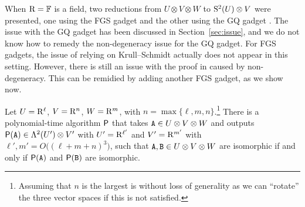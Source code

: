 When $\rng=\F$ is a field, two reductions from $U\otimes V\otimes W$ to $\S^2(U)\otimes V$ were presented, one using the FGS gadget \cite{TI1} and the other using the GQ gadget \cite{TI4}. The issue with the GQ gadget has been discussed in Section~\ref{sec:issue}, and we do not know how to remedy the non-degeneracy issue for the GQ gadget. For FGS gadgets, the issue of relying on Krull--Schmidt actually does not appear in this setting. However, there is still an issue with the proof in \cite{TI1} caused by non-degeneracy. This can be remidied by adding another FGS gadget, as we show now. 
\begin{theorem} \label{thm:AltMatSpIsom}
	Let $U=\rng^\ell$, $V=\rng^n$, $W=\rng^m$, with $n=\max\{\ell, m, n\}$.\footnote{Assuming that $n$ is the largest is without loss of generality as we can ``rotate'' the three vector spaces if this is not satisfied.} There is a polynomial-time algorithm $\algprobm{P}$ that takes $\tA\in U\otimes V\otimes W$ and outputs $\algprobm{P}(\tA)\in \Lambda^2(U')\otimes V'$ with $U'= \rng^{\ell'}$ and $V'=\rng^{m'}$ with $\ell', m'=O\big((\ell+m+n)^3\big)$,
	such that $\tA, \tB\in U\otimes V\otimes W$ are isomorphic if and only if $\algprobm{P}(\tA)$ and $\algprobm{P}(\tB)$ are isomorphic.
%	
\end{theorem}

